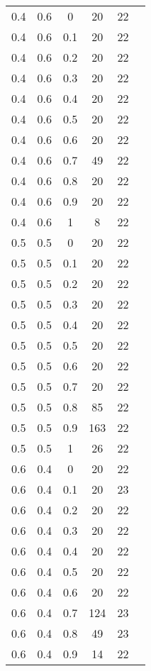 \documentclass[a4paper,14pt]{extreport}
\begin{document}
\begin{table}
\begin{minipage}[!h]{0.50\hsize}
\begin{center}
{\begin{tabular}{c@{\hspace{5mm}}c@{\hspace{5mm}}c@{\hspace{5mm}}c@{\hspace{5mm}}c@{\hspace{5mm}}c}
					\midrule
					0.4     &0.6    &0      &20    &22\\
					0.4     &0.6    &0.1    &20    &22\\
					0.4     &0.6    &0.2    &20    &22\\
					0.4     &0.6    &0.3    &20    &22\\
					0.4     &0.6    &0.4    &20    &22\\
					0.4     &0.6    &0.5    &20    &22\\
					0.4     &0.6    &0.6    &20    &22\\
					0.4     &0.6    &0.7    &49    &22\\
					0.4     &0.6    &0.8    &20    &22\\
					0.4     &0.6    &0.9    &20    &22\\
					0.4     &0.6    &1      &8     &22\\
					\midrule
					0.5     &0.5    &0      &20    &22\\
					0.5     &0.5    &0.1    &20    &22\\
					0.5     &0.5    &0.2    &20    &22\\
					0.5     &0.5    &0.3    &20    &22\\
					0.5     &0.5    &0.4    &20    &22\\
					0.5     &0.5    &0.5    &20    &22\\
					0.5     &0.5    &0.6    &20    &22\\
					0.5     &0.5    &0.7    &20    &22\\
					0.5     &0.5    &0.8    &85    &22\\
					0.5     &0.5    &0.9    &163   &22\\
					0.5     &0.5    &1      &26    &22\\
					\midrule
					0.6     &0.4    &0      &20    &22\\
					0.6     &0.4    &0.1    &20    &23\\
					0.6     &0.4    &0.2    &20    &22\\
					0.6     &0.4    &0.3    &20    &22\\
					0.6     &0.4    &0.4    &20    &22\\
					0.6     &0.4    &0.5    &20    &22\\
					0.6     &0.4    &0.6    &20    &22\\
					0.6     &0.4    &0.7    &124   &23\\
					0.6     &0.4    &0.8    &49    &23\\
					0.6     &0.4    &0.9    &14    &22\\

\end{tabular}}
\end{center}
\end{minipage}
\end{table}
\end{document}
